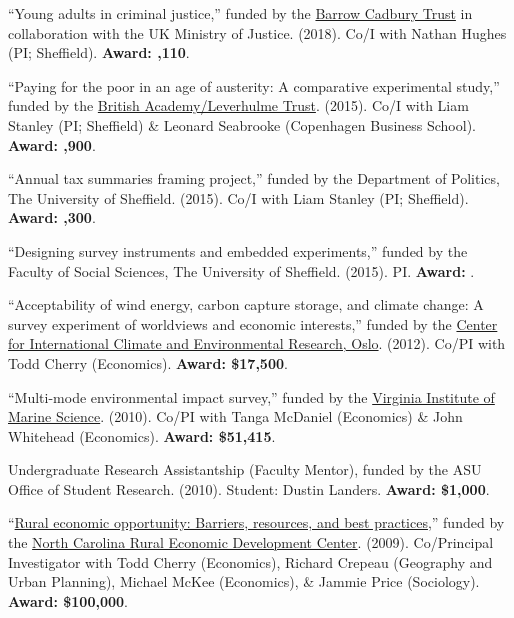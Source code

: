 \documentclass[12pt]{article}
\begin{document}
\begin{bibsection}
	\item ``Young adults in criminal justice,'' funded by the 
	\href{https://www.barrowcadbury.org.uk/}{Barrow Cadbury Trust} in collaboration with 
	the UK Ministry of Justice. 
 	(2018). Co\-/I with Nathan Hughes (PI; Sheffield). \textbf{Award: ,110}.
 	
 	 \item ``Paying for the poor in an age of austerity: 
    A comparative experimental study,'' funded by the \href{http://www.britac.ac.uk/index.cfm}
    {British Academy/Leverhulme Trust}.
   (2015). Co\-/I with Liam Stanley (PI; Sheffield) \& Leonard 
    Seabrooke (Copenhagen Business School).  \textbf{Award: ,900}.
 	
 		\item ``Annual tax summaries framing project,'' funded by the Department of Politics, 
	The University of Sheffield. (2015). Co\-/I with Liam Stanley (PI; Sheffield). \textbf{Award: ,300}.
	 
	\item ``Designing survey instruments and embedded experiments,'' 
	funded by the Faculty of Social Sciences, The University of Sheffield. (2015). PI. 
	\textbf{Award: }.
    
     \item ``Acceptability of wind energy, carbon capture storage, 
    and climate change: A survey experiment of worldviews and 
    economic interests,'' funded by 
    the \href{http://www.cicero.uio.no/}
    {Center for International Climate and Environmental Research, Oslo}. 
    (2012). Co\-/PI with Todd Cherry (Economics). \textbf{Award: \$17,500}.
    
     \item ``Multi-mode environmental impact survey,''
    funded by the \href{http://www.vims.edu/}
    {Virginia Institute of Marine Science}. (2010). Co\-/PI with Tanga McDaniel (Economics) \& John Whitehead (Economics). \textbf{Award: \$51,415}.
    
        \item Undergraduate Research Assistantship (Faculty Mentor), funded by the ASU Office of Student Research. (2010). Student: Dustin Landers. \textbf{Award: \$1,000}. 
    

    \item 
    ``\href{http://www.ncruralcenter.org/images/PDFs/ResearchInnovation/1_livingonmargins_aftermath_final.pdf}
    {Rural economic opportunity: Barriers, resources, and best practices},'' 
    funded by the \href{http://www.ncruralcenter.org/}
    {North Carolina Rural Economic Development Center}. (2009). Co\-/Principal Investigator with Todd Cherry (Economics), 
    Richard Crepeau (Geography and Urban Planning), 
    Michael McKee (Economics), \& Jammie Price (Sociology).  \textbf{Award: \$100,000}.
 

\end{bibsection}
\end{document}
